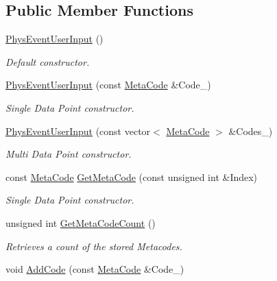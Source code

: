 \subsection*{Public Member Functions}
\begin{DoxyCompactItemize}
\item 
\hyperlink{classPhysEventUserInput_a6f8eaf698e8109d5cb30f2f17044f1ba}{PhysEventUserInput} ()
\begin{DoxyCompactList}\small\item\em Default constructor. \item\end{DoxyCompactList}\item 
\hyperlink{classPhysEventUserInput_ae13b1b02bfa3ef64dc4205478a68810f}{PhysEventUserInput} (const \hyperlink{classMetaCode}{MetaCode} \&Code\_\-)
\begin{DoxyCompactList}\small\item\em Single Data Point constructor. \item\end{DoxyCompactList}\item 
\hyperlink{classPhysEventUserInput_a0a9bd99d8db6f171ef3c87bd417ccc4a}{PhysEventUserInput} (const vector$<$ \hyperlink{classMetaCode}{MetaCode} $>$ \&Codes\_\-)
\begin{DoxyCompactList}\small\item\em Multi Data Point constructor. \item\end{DoxyCompactList}\item 
const \hyperlink{classMetaCode}{MetaCode} \hyperlink{classPhysEventUserInput_aa564530c27f6983bb412e46c2c7ed086}{GetMetaCode} (const unsigned int \&Index)
\begin{DoxyCompactList}\small\item\em Single Data Point constructor. \item\end{DoxyCompactList}\item 
unsigned int \hyperlink{classPhysEventUserInput_a86df812a38566a572134100a422a8799}{GetMetaCodeCount} ()
\begin{DoxyCompactList}\small\item\em Retrieves a count of the stored Metacodes. \item\end{DoxyCompactList}\item 
void \hyperlink{classPhysEventUserInput_a4f5b94c64cd08c15b480e441d25a385d}{AddCode} (const \hyperlink{classMetaCode}{MetaCode} \&Code\_\-)

\end{DoxyCompactItemize}
